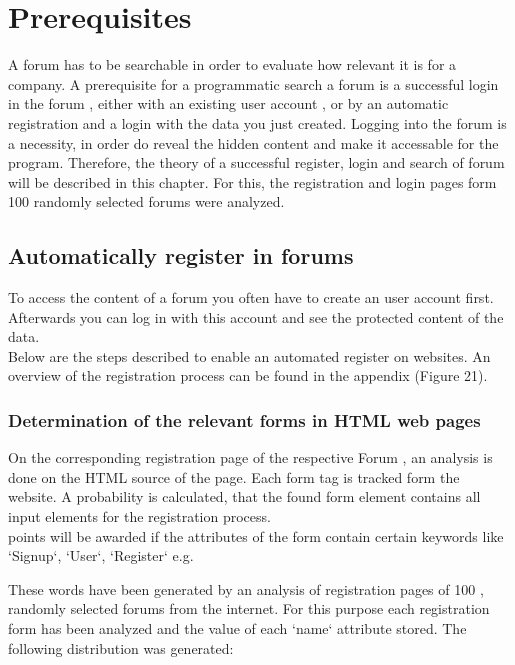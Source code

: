 \section{Prerequisites}
A forum has to be searchable in order to evaluate how relevant it is for a company.
A prerequisite for a programmatic search a forum is a successful login in the forum , either with an existing user account , or by an automatic registration and a login with the data you just created.
Logging into the forum is a necessity, in order do reveal the hidden content and make it accessable for the program. Therefore, the theory of a successful register, login and search of forum will be described in this chapter. For this, the registration and login pages form 100 randomly selected forums were analyzed.

\subsection {Automatically register in forums}
To access the content of a forum you often have to create an user account first. Afterwards you can log in with this account and see the protected content of the data.\\
Below are the steps described to enable an automated register on websites. An overview of the registration process can be found in the appendix (Figure 21).

\subsubsection{Determination of the relevant forms in HTML web pages}
On the corresponding registration page of the respective Forum , an analysis is done on the HTML source of the page.
Each form tag is tracked form the website. A probability is calculated, that the found form element contains all input elements for the registration process.\\
points will be awarded if the attributes of the form contain certain keywords like `Signup`, `User`, `Register` e.g.


These words have been generated by an analysis of  registration pages of 100 , randomly selected forums from the internet. For this purpose each registration form has been analyzed and the value of each `name` attribute stored. The following distribution was generated:


